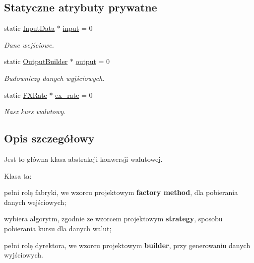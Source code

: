 \subsection*{\-Statyczne atrybuty prywatne}
\begin{DoxyCompactItemize}
\item 
static \hyperlink{class_input_data}{\-Input\-Data} $\ast$ \hyperlink{class_converter_a5bea25c79f8853dd57505af05af0b42a}{input} = 0
\begin{DoxyCompactList}\small\item\em \-Dane wejściowe. \end{DoxyCompactList}\item 
static \hyperlink{class_output_builder}{\-Output\-Builder} $\ast$ \hyperlink{class_converter_a5f69c39d5bf6a2f969720b04d8dfe0c3}{output} = 0
\begin{DoxyCompactList}\small\item\em \-Budowniczy danych wyjściowych. \end{DoxyCompactList}\item 
static \hyperlink{class_f_x_rate}{\-F\-X\-Rate} $\ast$ \hyperlink{class_converter_a84a5722a12516505b73cf900938138ff}{ex\-\_\-rate} = 0
\begin{DoxyCompactList}\small\item\em \-Nasz kurs walutowy. \end{DoxyCompactList}\end{DoxyCompactItemize}


\subsection{\-Opis szczegółowy}
\-Jest to główna klasa abstrakcji konwersji walutowej.\par
\par
 \-Klasa ta\-:\par

\begin{DoxyItemize}
\item pełni rolę fabryki, we wzorcu projektowym {\bfseries factory method}, dla pobierania danych wejściowych;\par

\item wybiera algorytm, zgodnie ze wzorcem projektowym {\bfseries strategy}, sposobu pobierania kursu dla danych walut;\par

\item pełni rolę dyrektora, we wzorcu projektowym {\bfseries builder}, przy generowaniu danych wyjściowych. 
\end{DoxyItemize}

